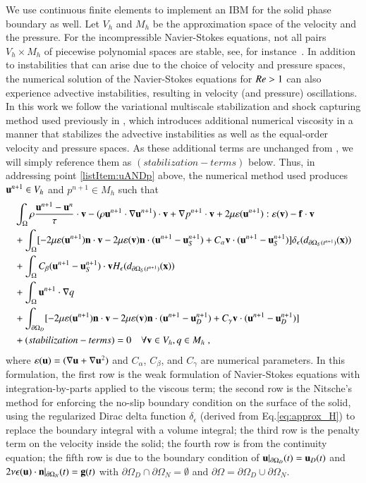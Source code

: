 \documentclass[final,3p,times]{elsarticle}
\newcommand{\bg}{\mathbf{g}}
\newcommand\Rey{\mbox{\textit{Re}}}
\begin{document}
We use continuous finite elements to implement an IBM for the solid phase boundary as well.
Let $V_h$ and $M_h$ be the approximation space of the velocity and the pressure. For the incompressible Navier-Stokes equations, not all pairs $V_h\times M_h$ of piecewise polynomial spaces are stable, see, for instance~\cite{Arnold1990, EG04}. In addition to instabilities that can arise due to the choice of velocity and pressure spaces, the numerical solution of the Navier-Stokes equations for ${\Rey}>1$ can also experience advective instabilities, resulting in velocity (and pressure) oscillations. In this work we follow the variational multiscale stabilization and shock capturing method used previously in \cite{KAFB11}, which introduces additional numerical viscosity in a manner that stabilizes the advective instabilities as well as the equal-order velocity and pressure spaces. As these additional terms are unchanged from \cite{KAFB11}, we will simply reference them as $(stabilization-terms)$ below. Thus, in addressing point \ref{listItem:uANDp} above, the numerical method used produces $\mathbf{u}^{n+1}\in V_h$ and $p^{n+1}\in M_h$ such that 
\begin{align}
   &\int_\Omega\rho \frac{\mathbf{u}^{n+1}-\mathbf{u}^n}{\tau}\cdot\mathbf{v} - (\rho \mathbf{u}^{n+1}\cdot \nabla \mathbf{u}^{n+1})\cdot \mathbf{v} 
   +\nabla p^{n+1}\cdot\mathbf{v} +2\mu\varepsilon(\mathbf{u}^{n+1}):\varepsilon(\mathbf{v})
   -\mathbf{f}\cdot\mathbf{v}\nonumber\\
   &+\int_\Omega [-2\mu \varepsilon(\mathbf{u}^{n+1})\mathbf{n}\cdot\mathbf{v}
   -2\mu\varepsilon(\mathbf{v})\mathbf{n}\cdot(\mathbf{u}^{n+1}-\mathbf{u}_S^{n+1})
   +C_\alpha\mathbf{v}\cdot(\mathbf{u}^{n+1}-\mathbf{u}_S^{n+1})]\delta_\epsilon(d_{\partial\Omega_S(t^{n+1})}(\mathbf{x}))\nonumber\\
   &+\int_\Omega C_\beta (\mathbf{u}^{n+1}-\mathbf{u}_S^{n+1})\cdot\mathbf{v} H_\epsilon(d_{\partial\Omega_S(t^{n+1})}(\mathbf{x}))\nonumber\\
   &+\int_\Omega \mathbf{u}^{n+1}\cdot\nabla q \nonumber\\
   &+\int_{\partial\Omega_D} [-2\mu\varepsilon(\mathbf{u}^{n+1})\mathbf{n}\cdot\mathbf{v}
   -2\mu\varepsilon(\mathbf{v})\mathbf{n}\cdot(\mathbf{u}^{n+1}-\mathbf{u}_D^{n+1})
   +C_\gamma\mathbf{v}\cdot(\mathbf{u}^{n+1}-\mathbf{u}_D^{n+1})]\nonumber\\
   &+(stabilization-terms)=0 \quad\forall \mathbf{v}\in V_h, q\in M_h \; ,
 \end{align}
 where $\varepsilon(\mathbf{u}) = (\nabla \mathbf{u} + \nabla \mathbf{u}^2)$ and $C_{\alpha}$, $C_{\beta}$, and $C_{\gamma}$ are numerical parameters. In this formulation, the first row is the weak formulation of Navier-Stokes equations with integration-by-parts applied to the  viscous term; the second row is the Nitsche's method for enforcing the no-slip boundary
condition on the surface of the solid, using the regularized Dirac delta function $\delta_{\epsilon}$ (derived from Eq.\eqref{eq:approx_H}) to replace the boundary integral with a volume integral; the third row is the penalty term on the velocity inside 
the solid; the fourth row is from the continuity equation; the fifth row is due to the boundary condition of $\mathbf{u}|_{\partial\Omega_D}(t)=\mathbf{u}_D(t)$ and $2\nu\epsilon(\bu)\cdot\bn|_{\partial\Omega_N}(t)=\bg(t)$ with $\partial\Omega_D\cap\partial\Omega_N=\emptyset$ and  $\partial\Omega=\partial\Omega_D\cup\partial\Omega_N$.
\end{document}
